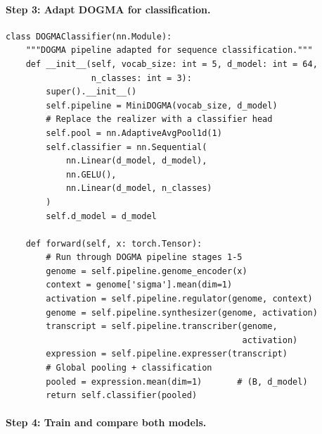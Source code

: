 \paragraph{Step 3: Adapt DOGMA for classification.}

\begin{lstlisting}[style=dogmapython, caption={Lab 7: DOGMA classifier variant.}]
class DOGMAClassifier(nn.Module):
    """DOGMA pipeline adapted for sequence classification."""
    def __init__(self, vocab_size: int = 5, d_model: int = 64,
                 n_classes: int = 3):
        super().__init__()
        self.pipeline = MiniDOGMA(vocab_size, d_model)
        # Replace the realizer with a classifier head
        self.pool = nn.AdaptiveAvgPool1d(1)
        self.classifier = nn.Sequential(
            nn.Linear(d_model, d_model),
            nn.GELU(),
            nn.Linear(d_model, n_classes)
        )
        self.d_model = d_model

    def forward(self, x: torch.Tensor):
        # Run through DOGMA pipeline stages 1-5
        genome = self.pipeline.genome_encoder(x)
        context = genome['sigma'].mean(dim=1)
        activation = self.pipeline.regulator(genome, context)
        genome = self.pipeline.synthesizer(genome, activation)
        transcript = self.pipeline.transcriber(genome,
                                               activation)
        expression = self.pipeline.expresser(transcript)
        # Global pooling + classification
        pooled = expression.mean(dim=1)       # (B, d_model)
        return self.classifier(pooled)
\end{lstlisting}

\paragraph{Step 4: Train and compare both models.}

